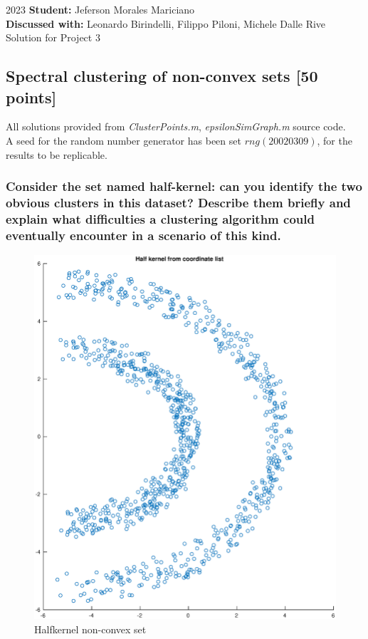 \documentclass[unicode,11pt,a4paper,oneside,numbers=endperiod,openany]{scrartcl}
\begin{document}
\setassignment
{}

{2023}
{\textbf{Student:} Jeferson Morales Mariciano \\\newline}
{\textbf{Discussed with:} Leonardo Birindelli, Filippo Piloni, Michele Dalle Rive}
{Solution for Project 3}{}
\newline

\assignmentpolicy


\newpage

\subsection{Spectral clustering of non-convex sets [50 points]}

All solutions provided from \textit{ClusterPoints.m}, \textit{epsilonSimGraph.m} source code. \\
A seed for the random number generator has been set $rng(20020309)$, for the results to be replicable.

\subsubsection{
    Consider the set named half-kernel: can you identify the two
    obvious clusters in this dataset? Describe them briefly and explain what difficulties a clustering algorithm could
    eventually encounter in a scenario of this kind.}


\begin{figure}[H]
    \centering
    \caption{Halfkernel non-convex set}
    \label{fig:ex1-1-halfkernel}
    \includegraphics[width=.5\textwidth, trim={0cm 3cm 0cm 0cm}]{./img/ex1-1-halfkernel}
\end{figure}
\end{document}
